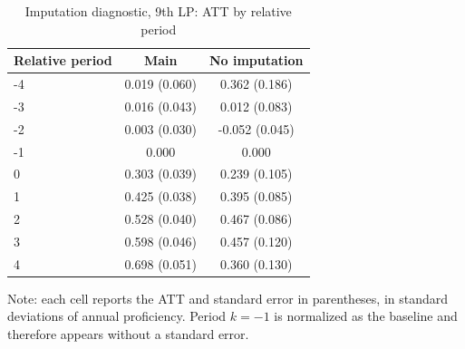 ﻿\begin{table}[!htbp]
\centering
\caption{Imputation diagnostic, 9th LP: ATT by relative period}
\label{tab:ap_event_imputacao_9th_lp}
\vspace{-0.15cm}
\scriptsize
\setlength{\tabcolsep}{4pt}
\renewcommand{\arraystretch}{0.92}
\begin{tabular}{lcc}
\toprule
Relative period & Main & No imputation \\
\midrule
-4 & 0.019 (0.060) & 0.362 (0.186) \\
-3 & 0.016 (0.043) & 0.012 (0.083) \\
-2 & 0.003 (0.030) & -0.052 (0.045) \\
-1 & 0.000 & 0.000 \\
0 & 0.303 (0.039) & 0.239 (0.105) \\
1 & 0.425 (0.038) & 0.395 (0.085) \\
2 & 0.528 (0.040) & 0.467 (0.086) \\
3 & 0.598 (0.046) & 0.457 (0.120) \\
4 & 0.698 (0.051) & 0.360 (0.130) \\
\bottomrule
\end{tabular}
\begin{flushleft}
\footnotesize Note: each cell reports the ATT and standard error in parentheses, in standard deviations of annual proficiency. Period \(k=-1\) is normalized as the baseline and therefore appears without a standard error.
\end{flushleft}
\end{table}



